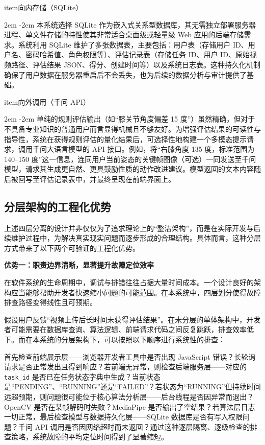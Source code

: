 \documentclass[UTF8,twoside]{ctexrep}
\makeatletter
\def@NAT@last@yr{\@citea}%
\def@NAT@last@yr{-\NAT@penalty}%
\newcommand{\listbodyaligntext}[1]{%
  \par\begingroup
    \parindent=0pt
    \parshape=2 2em \dimexpr\textwidth-2em\relax 0pt \textwidth
    \noindent\ignorespaces#1\unskip\par
  \endgroup
}
\newcommand{\researchitem}[2]{%
  \csname item\endcsname #1%
  \listbodyaligntext{#2}%
}
\makeatother
\begin{document}
\begin{researchlist}
  
\researchitem{向内存储（SQLite）}{本系统选择 SQLite 作为嵌入式关系型数据库，其无需独立部署服务器进程、单文件存储的特性使其非常适合桌面级或轻量级 Web 应用的后端存储需求。系统利用 SQLite 维护了多张数据表，主要包括：用户表（存储用户 ID、用户名、密码哈希值、角色权限等）、评估记录表（存储任务 ID、用户 ID、原始视频路径、评估结果 JSON、得分、创建时间等）以及系统日志表。这种持久化机制确保了用户数据在服务器重启后不会丢失，也为后续的数据分析与审计提供了基础。}

  
\researchitem{向外调用（千问 API）}{单纯的规则评估输出（如“膝关节角度偏差 15 度”）虽然精确，但对于不具备专业知识的普通用户而言显得机械且不够友好。为增强评估结果的可读性与指导性，系统在获得规则评估的量化结果后，可选择性地构建一个多模态提示请求，调用千问大语言模型的 API 接口。例如，将“右膝角度 135 度，标准范围为 140--150 度”这一信息，连同用户当前姿态的关键帧图像（可选）一同发送至千问模型，请求其生成更自然、更具鼓励性质的动作改进建议。模型返回的文本内容随后被回写至评估记录表中，并最终呈现在前端界面上。}
\end{researchlist}

\subsection{分层架构的工程化优势}

上述四层分离的设计并非仅仅为了追求理论上的“整洁架构”，而是在实际开发与后续维护过程中，为解决真实现实问题而逐步形成的合理结构。具体而言，这种分层方式带来了以下两个可验证的工程化优势。

\textbf{优势一：职责边界清晰，显著提升故障定位效率}

在软件系统的生命周期中，调试与排错往往占据大量时间成本。一个设计良好的架构应当能够帮助开发者快速缩小问题的可能范围。在本系统中，四层划分使得故障排查路径变得线性且可预期。

假设用户反馈“视频上传后长时间未获得评估结果”。在未分层的单体架构中，开发者可能需要在数据库查询、算法逻辑、前端请求代码之间反复跳跃，排查效率低下。而在本系统的分层架构下，可以按照以下顺序进行系统性的排查：

首先检查前端展示层——浏览器开发者工具中是否出现 JavaScript 错误？长轮询请求是否正常发出且得到响应？若前端无异常，则检查后端服务层——对应的 \texttt{task\_id} 是否已在任务状态字典中生成？当前状态是“PENDING”、“RUNNING”还是“FAILED”？若状态为“RUNNING”但持续时间远超预期，则问题很可能位于核心算法分析层——后台线程是否因异常而退出？OpenCV 是否在某帧解码时失败？MediaPipe 是否输出了空结果？若算法层日志一切正常，最后检查模型与数据持久化层——SQLite 数据库是否有写入权限问题？千问 API 调用是否因网络超时而未返回？通过这种逐层隔离、逐级检查的排查策略，系统故障的平均定位时间得到了显著缩短。
\end{document}
